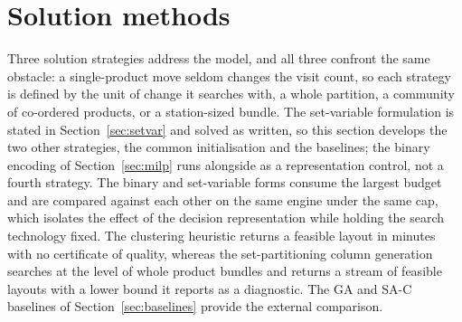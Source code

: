 \documentclass[]{interact}
\begin{document}
\section{Solution methods}\label{sec:methods}
Three solution strategies address the model, and all three confront the same obstacle: a single-product move seldom changes the visit count, so each strategy is defined by the unit of change it searches with, a whole partition, a community of co-ordered products, or a station-sized bundle. The set-variable formulation is stated in Section~\ref{sec:setvar} and solved as written, so this section develops the two other strategies, the common initialisation and the baselines; the binary encoding of Section~\ref{sec:milp} runs alongside as a representation control, not a fourth strategy. The binary and set-variable forms consume the largest budget and are compared against each other on the same engine under the same cap, which isolates the effect of the decision representation while holding the search technology fixed. The clustering heuristic returns a feasible layout in minutes with no certificate of quality, whereas the set-partitioning column generation searches at the level of whole product bundles and returns a stream of feasible layouts with a lower bound it reports as a diagnostic. The GA and SA-C baselines of Section~\ref{sec:baselines} provide the external comparison.
\end{document}
